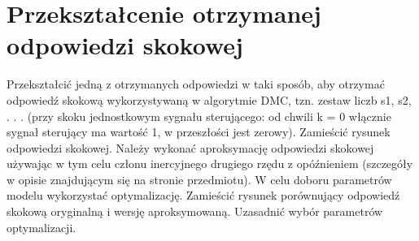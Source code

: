 \section{Przekształcenie otrzymanej odpowiedzi skokowej}
Przekształcić jedną z otrzymanych odpowiedzi w taki sposób, aby otrzymać odpowiedź
skokową wykorzystywaną w algorytmie DMC, tzn. zestaw liczb s1, s2, . . . (przy skoku
jednostkowym sygnału sterującego: od chwili k = 0 włącznie sygnał sterujący ma
wartość 1, w przeszłości jest zerowy). Zamieścić rysunek odpowiedzi skokowej. Należy
wykonać aproksymację odpowiedzi skokowej używając w tym celu członu inercyjnego
drugiego rzędu z opóźnieniem (szczegóły w opisie znajdującym się na stronie przedmiotu). W celu doboru parametrów modelu wykorzystać optymalizację. Zamieścić rysunek
porównujący odpowiedź skokową oryginalną i wersję aproksymowaną. Uzasadnić wybór parametrów optymalizacji.